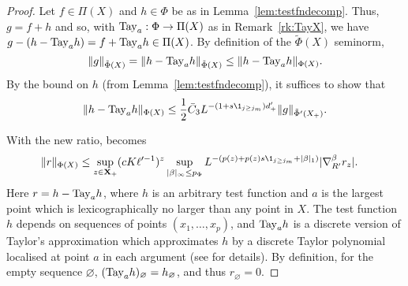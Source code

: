 \begin{proof}
Let $f\in\Pi(X)$ and $h\in\Phi$ be as in Lemma~\ref{lem:testfndecomp}.
Thus, $g = f + h$ and so, with ${\rm Tay}_a : \Phi \rightarrow \Pi(X)$ as in Remark~\ref{rk:TayX},
we have $g - (h - {\rm Tay}_a h) = f + {\rm Tay}_a h \in \Pi(X)$.
By definition of the $\tilde\Phi(X)$ seminorm,
\begin{equation}
\|g\|_{\tilde\Phi(X)}
	=
\|h - {\rm Tay}_a h\|_{\tilde\Phi(X)}
	\le
\|h - {\rm Tay}_a h\|_{\Phi(X)}.
\end{equation}
By the bound on $h$ (from Lemma~\ref{lem:testfndecomp}), it suffices to
show that
\begin{equation}
\|h - \Tay_a h\|_{\Phi(X)}
	\le
\frac12 \bar C_3 L^{-(1 + s \1_{j \ge j_m}) d'_+} \|g\|_{\tilde\Phi'(X_+)}.
\end{equation}


With the new ratio, \cite[\eqref{loc-e:rhognew}]{BS-rg-loc} becomes
\begin{align}
\label{e:rhognew-improved}
    \|r\|_{\Phi (X)}
    & \le
    \sup_{z \in {\mathbf X}_+}
    (cK\ell'^{-1})^z
    \sup_{|\beta|_\infty \le p_\Phi}
    L^{-(p(z) + p(z) s \1_{{j\geq j_m}} +|\beta|_1)}
    | \nabla_{R'}^\beta  r_{z}  |.
\end{align}
Here $r = h - {\rm Tay}_a h$, where $h$ is an arbitrary test function and $a$ is the largest
point which is lexicographically no larger than any point in $X$.
The test function $h$ depends on sequences of points $(x_1, \dots, x_p)$,
and ${\rm Tay}_a h$ is a discrete version of Taylor's approximation which approximates $h$ by a
discrete Taylor polynomial localised at point $a$ in each argument (see \cite{BS-rg-loc} for details).
By definition, for the empty sequence $\varnothing$, $({\rm Tay}_a h)_\varnothing = h_\varnothing$,
and thus
$r_\varnothing = 0$.


\end{proof}
